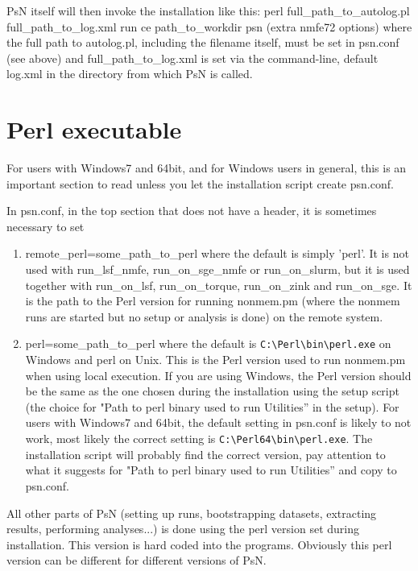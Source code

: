 PsN itself will then invoke the installation like this:
perl full\_path\_to\_autolog.pl full\_path\_to\_log.xml run ce path\_to\_workdir psn (extra nmfe72 options)
where the full path to autolog.pl, including the filename itself, must be set in psn.conf (see above) and full\_path\_to\_log.xml is set via the command-line, default log.xml in the directory from which PsN is called.

\section{Perl executable}
For users with Windows7 and 64bit, and for Windows users in general, this is an important section to read unless you let the installation script create psn.conf.

In psn.conf, in the top section that does not have a header, it is sometimes necessary to set

\begin{enumerate}
\item remote\_perl=some\_path\_to\_perl
where the default is simply 'perl'. It is not used with run\_lsf\_nmfe, run\_on\_sge\_nmfe or run\_on\_slurm, but it is used together with run\_on\_lsf, run\_on\_torque, run\_on\_zink and run\_on\_sge. It is the path to the Perl version for running nonmem.pm (where the nonmem runs are started but no setup or analysis is done) on the remote system.

\item perl=some\_path\_to\_perl
where the default is \verb|C:\Perl\bin\perl.exe| on Windows and perl on Unix. This is the Perl version used to run nonmem.pm when using local execution. If you are using Windows, the Perl version should be the same as the one chosen during the installation using the setup script (the choice for "Path to perl binary used to run Utilities” in the setup).
For users with Windows7 and 64bit, the default setting in psn.conf is likely to not work, most likely the correct setting is 
\verb|C:\Perl64\bin\perl.exe|. 
The installation script will probably find the correct version, pay attention to what it suggests for "Path to perl binary used to run Utilities” and copy to psn.conf. 
\end{enumerate}

All other parts of PsN (setting up runs, bootstrapping datasets, extracting results, performing analyses...) is done using the perl version set during installation. This version is hard 
coded into the programs. Obviously this perl version can be different for different versions of PsN.

